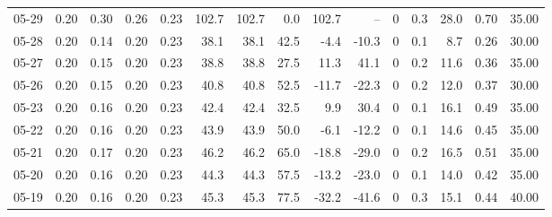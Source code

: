 \begin{threeparttable}
{\begin{tabular}{lrrrrrrrrrrrrrr}
  05-29 &          0.20 &          0.30 &          0.26 &        0.23 &               102.7 &              102.7 &                 0.0 &      102.7 &           -- &              0 &                 0.3 &             28.0 &            0.70 &                  35.00 \\
  05-28 &          0.20 &          0.14 &          0.20 &        0.23 &                38.1 &               38.1 &                42.5 &       -4.4 &        -10.3 &              0 &                 0.1 &              8.7 &            0.26 &                  30.00 \\
  05-27 &          0.20 &          0.15 &          0.20 &        0.23 &                38.8 &               38.8 &                27.5 &       11.3 &         41.1 &              0 &                 0.2 &             11.6 &            0.36 &                  35.00 \\
  05-26 &          0.20 &          0.15 &          0.20 &        0.23 &                40.8 &               40.8 &                52.5 &      -11.7 &        -22.3 &              0 &                 0.2 &             12.0 &            0.37 &                  30.00 \\
  05-23 &          0.20 &          0.16 &          0.20 &        0.23 &                42.4 &               42.4 &                32.5 &        9.9 &         30.4 &              0 &                 0.1 &             16.1 &            0.49 &                  35.00 \\
  05-22 &          0.20 &          0.16 &          0.20 &        0.23 &                43.9 &               43.9 &                50.0 &       -6.1 &        -12.2 &              0 &                 0.1 &             14.6 &            0.45 &                  35.00 \\
  05-21 &          0.20 &          0.17 &          0.20 &        0.23 &                46.2 &               46.2 &                65.0 &      -18.8 &        -29.0 &              0 &                 0.2 &             16.5 &            0.51 &                  35.00 \\
  05-20 &          0.20 &          0.16 &          0.20 &        0.23 &                44.3 &               44.3 &                57.5 &      -13.2 &        -23.0 &              0 &                 0.1 &             14.0 &            0.42 &                  35.00 \\
  05-19 &          0.20 &          0.16 &          0.20 &        0.23 &                45.3 &               45.3 &                77.5 &      -32.2 &        -41.6 &              0 &                 0.3 &             15.1 &            0.44 &                  40.00 \\

\end{tabular}}
\end{threeparttable}
